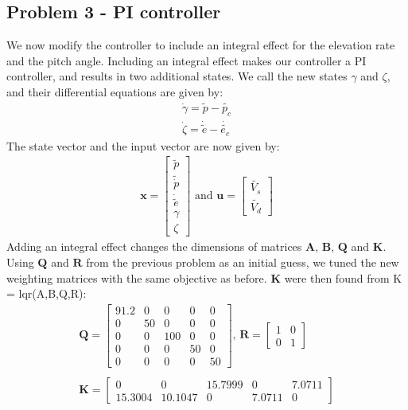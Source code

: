 \subsection{Problem 3 - PI controller}
We now modify the controller to include an integral effect for the elevation rate and the pitch angle. Including an integral effect makes our controller a PI controller, and results in two additional states. We call the new states $\gamma$ and $\zeta$, and their differential equations are given by:
\begin{gather*}
    \dot{\gamma} = \tilde{p} - \tilde{p_c}\\
    \dot{\zeta} = \dot{\tilde{e}} - \dot{\tilde{e_c}}
\end{gather*}
The state vector and the input vector are now given by:
\begin{gather*}
    \mathbf{x} = \begin{bmatrix}
    \tilde{p} \\ \tilde{\dot{p}} \\
    \dot{\tilde{e}} \\ \gamma \\ \zeta \end{bmatrix}
    \text{ and } \mathbf{u} = \begin{bmatrix}
    \tilde{V_s} \\ \tilde{V_d} \end{bmatrix}
\end{gather*}
Adding an integral effect changes the dimensions of matrices $\mathbf{A}$, $\mathbf{B}$, $\mathbf{Q}$ and $\mathbf{K}$. Using $\mathbf{Q}$ and $\mathbf{R}$ from the previous problem as an initial guess, we tuned the new weighting matrices with the same objective as before. $\mathbf{K}$ were then found from K = lqr(A,B,Q,R):
\begin{gather}\label{eq:P3_weighting_matrices}
    \mathbf{Q} = \begin{bmatrix}
    91.2 & 0 & 0 & 0 & 0 \\
    0 & 50 & 0 & 0 & 0 \\
    0 & 0 & 100 & 0 & 0 \\
    0 & 0 & 0 & 50 & 0 \\
    0 & 0 & 0 & 0 & 50 \end{bmatrix}\text{, }
    \mathbf{R} = \begin{bmatrix}
    1 & 0 \\
    0 & 1 \end{bmatrix} \\\nonumber \\
    \mathbf{K} = \begin{bmatrix}\nonumber
    0 & 0 & 15.7999 & 0 & 7.0711\\
   15.3004 & 10.1047 & 0 & 7.0711 & 0 \end{bmatrix}
\end{gather}
